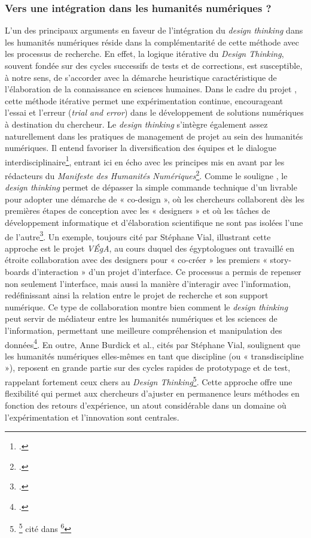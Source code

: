 \subsubsection{Vers une intégration dans les humanités numériques ?}

L'un des principaux arguments en faveur de l'intégration du \textit{design thinking} dans les humanités numériques réside dans la complémentarité de cette méthode avec les processus de recherche. En effet, la logique itérative du \textit{Design Thinking}, souvent fondée sur des cycles successifs de tests et de corrections, est susceptible, à notre sens, de s’accorder avec la démarche heuristique caractéristique de l’élaboration de la connaissance en sciences humaines. Dans le cadre du projet \pense, cette méthode itérative permet une expérimentation continue, encourageant l'essai et l'erreur (\textit{trial and error}) dans le développement de solutions numériques à destination du chercheur.
Le \textit{design thinking} s’intègre également assez naturellement dans les pratiques de management de projet au sein des humanités numériques. Il entend favoriser la diversification des équipes et le dialogue interdisciplinaire\footcite{peche_design_2016}, entrant ici en écho avec les principes mis en avant par les rédacteurs du \textit{Manifeste des Humanités Numériques}\footcite{dacos_manifeste_2011}. Comme le souligne \citeauthor{vial_tournant_2016}, le \textit{design thinking} permet de dépasser la simple commande technique d’un livrable pour adopter une démarche de « co-design », où les chercheurs collaborent dès les premières étapes de conception avec les « designers » et où les tâches de développement informatique et d’élaboration scientifique ne sont pas isolées l’une de l’autre\footcite{vial_tournant_2016}.
Un exemple, toujours cité par Stéphane Vial, illustrant cette approche est le projet \textit{VÉgA}, au cours duquel des égyptologues ont travaillé en étroite collaboration avec des designers pour « co-créer » les premiers « story-boards d'interaction » d’un projet d’interface. Ce processus a permis de repenser non seulement l’interface, mais aussi la manière d’interagir avec l’information, redéfinissant ainsi la relation entre le projet de recherche et son support numérique. Ce type de collaboration montre bien comment le \textit{design thinking} peut servir de médiateur entre les humanités numériques et les sciences de l’information, permettant une meilleure compréhension et manipulation des données\footcite{vial_tournant_2016}.
En outre, Anne Burdick et al., cités par Stéphane Vial, soulignent que les humanités numériques elles-mêmes en tant que discipline (ou « transdiscipline »), reposent en grande partie sur des cycles rapides de prototypage et de test, rappelant fortement ceux chers au \textit{Design Thinking}\footnote{\footcite{burdick_digital_humanities_2012} cité dans \footcite{vial_tournant_2016}}. Cette approche offre une flexibilité qui permet aux chercheurs d'ajuster en permanence leurs méthodes en fonction des retours d'expérience, un atout considérable dans un domaine où l'expérimentation et l’innovation sont centrales.

